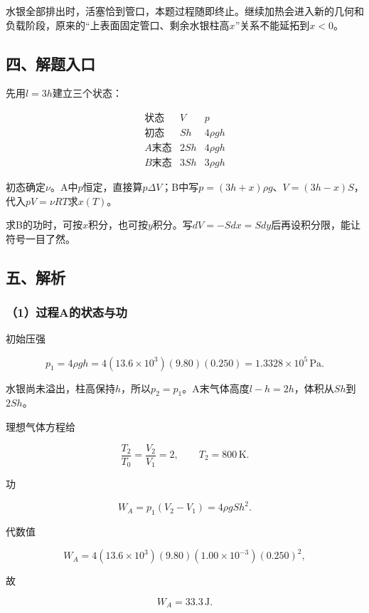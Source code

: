 \documentclass[12pt,a4paper,fontset=fandol]{ctexart}
\begin{document}
水银全部排出时，活塞恰到管口，本题过程随即终止。继续加热会进入新的几何和负载阶段，原来的``上表面固定管口、剩余水银柱高\(x\)''关系不能延拓到\(x<0\)。

\subsection{四、解题入口}\label{ux56dbux89e3ux9898ux5165ux53e3-1}

先用\(l=3h\)建立三个状态：

\[
\begin{array}{c|c|c}
\text{状态}&V&p\\ \hline
\text{初态}&Sh&4\rho gh\\
A\text{末态}&2Sh&4\rho gh\\
B\text{末态}&3Sh&3\rho gh
\end{array}
\]

初态确定\(\nu\)。A中\(p\)恒定，直接算\(p\Delta V\)；B中写\(p=(3h+x)\rho g\)、\(V=(3h-x)S\)，代入\(pV=\nu RT\)求\(x(T)\)。

求B的功时，可按\(x\)积分，也可按\(y\)积分。写\(dV=-Sdx=Sdy\)后再设积分限，能让符号一目了然。

\subsection{五、解析}\label{ux4e94ux89e3ux6790-1}

\subsubsection{（1）过程A的状态与功}\label{ux8fc7ux7a0baux7684ux72b6ux6001ux4e0eux529f}

初始压强

\[
p_1=4\rho gh
=4(13.6\times10^3)(9.80)(0.250)
=1.3328\times10^5\,\mathrm{Pa}.
\]

水银尚未溢出，柱高保持\(h\)，所以\(p_2=p_1\)。A末气体高度\(l-h=2h\)，体积从\(Sh\)到\(2Sh\)。

理想气体方程给

\[
\frac{T_2}{T_0}=\frac{V_2}{V_1}=2,
\qquad T_2=800\,\mathrm K.
\]

功

\[
W_A=p_1(V_2-V_1)=4\rho gSh^2.
\]

代数值

\[
W_A=4(13.6\times10^3)(9.80)
(1.00\times10^{-3})(0.250)^2,
\]

故

\[
\boxed{W_A=33.3\,\mathrm J}.
\]
\end{document}
